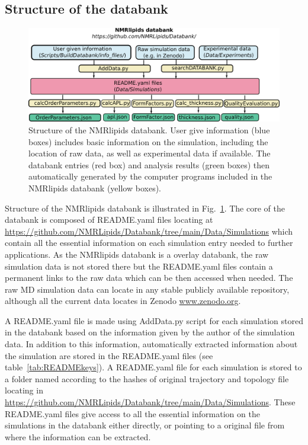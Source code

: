 \documentclass[fleqn,10pt]{wlscirep}
\begin{document}
\subsection{Structure of the databank}

\begin{figure}
  \includegraphics[width=\textwidth]{Figures/DataBankChart.pdf}
  \caption{Structure of the NMRlipids databank. User give information (blue boxes) includes basic information on the simulation, including the location of raw data, as well as experimental data if available. The databank entries (red box) and analysis results (green boxes) then automatically generated by the computer programs included in the NMRlipids databank (yellow boxes).}\label{DatabankStructure}
\end{figure}

Structure of the NMRlipids databank is illustrated in Fig.~\ref{DatabankStructure}. The core of the databank is composed of README.yaml files locating at \url{https://github.com/NMRLipids/Databank/tree/main/Data/Simulations} which contain all the essential information on each simulation entry needed to further applications. As the NMRlipids databank is a overlay databank, the raw simulation data is not stored there but the README.yaml files contain a permanent links to the raw data which can be then accessed when needed. The raw MD simulation data can locate in any stable publicly available repository, although all the current data locates in Zenodo \url{www.zenodo.org}. 

A README.yaml file is made using AddData.py script for each simulation stored in the databank based on the information given by the author of the simulation data. In addition to this information, automatically extracted information about the simulation are stored in the README.yaml files (see table~\ref{tab:READMEkeys}). A README.yaml file for each simulation is stored to a folder named according to the hashes of original trajectory and topology file locating in \url{https://github.com/NMRLipids/Databank/tree/main/Data/Simulations}. These README.yaml files give access to all the essential information on the simulations in the databank either directly, or pointing to a original file from where the information can be extracted.
\end{document}

